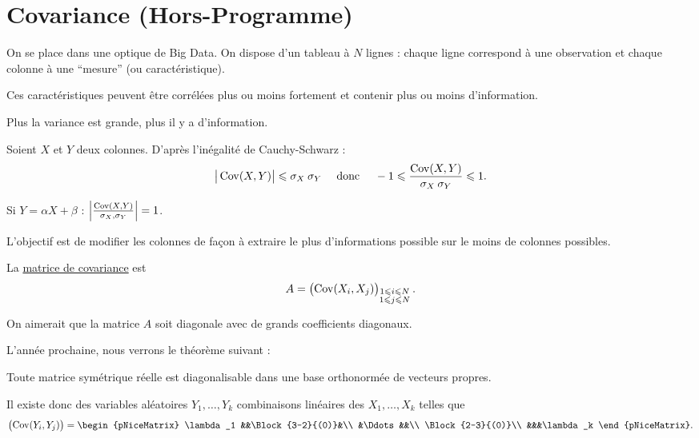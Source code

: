\part{Covariance ({\sc Hors-Programme})}

On se place dans une optique de Big Data.
On dispose d'un tableau à $N$ lignes : chaque ligne correspond à une observation et chaque colonne à une ``mesure'' (ou caractéristique).

Ces caractéristiques peuvent être corrélées plus ou moins fortement et contenir plus ou moins d'information.

Plus la variance est grande, plus il y a d'information.

Soient $X$ et $Y$ deux colonnes. D'après l'inégalité de Cauchy-Schwarz : \[
	\big|\operatorname{Cov}(X,Y)\big| \leqslant \sigma_X\:\sigma_Y \quad \text{ donc } \quad -1 \leqslant \frac{\operatorname{Cov}(X,Y)}{\sigma_X\:\sigma_Y} \leqslant 1
.\]

Si $Y = \alpha X + \beta$ : \hfill$\left| \frac{\operatorname{Cov}(X,Y)}{\sigma_X,\sigma_Y} \right| = 1$.\hfill~\hfill~

L'objectif est de modifier les colonnes de façon à extraire le plus d'informations possible sur le moins de colonnes possibles.

La \underline{matrice de covariance} est \[
	A = \begin{pmatrix}
		\operatorname{Cov}(X_i,X_j)
	\end{pmatrix}_{\substack{1\leqslant i\leqslant N\\1\leqslant j\leqslant N}}
.\]

On aimerait que la matrice $A$ soit diagonale avec de grands coefficients diagonaux.

L'année prochaine, nous verrons le théorème suivant :
\begin{thm}
	Toute matrice symétrique réelle est diagonalisable dans une base orthonormée de vecteurs propres.
\end{thm}

Il existe donc des variables aléatoires $Y_1, \ldots, Y_k$ combinaisons linéaires des $X_1, \ldots, X_k$ telles que \[
	\begin{pmatrix}
		\Cov(Y_i,Y_j)
	\end{pmatrix} =
	\begin{pNiceMatrix}
		\lambda_1 &&\Block{3-2}{(0)}&\\
		&\Ddots&&\\
		\Block{2-3}{(0)}\\
		&&&\lambda_k
	\end{pNiceMatrix}
.\]

